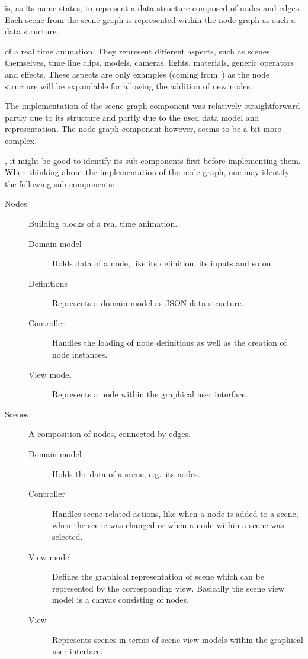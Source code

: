 \documentclass[%
    a4paper,    %
    justified,  %
    nobib,      %
    openany     %
]{tufte-book}
\begin{document}
 is, as its name states, to
represent a data structure composed of nodes and edges. Each scene from the
scene graph is represented within the node graph as such a data structure.

 of a real time animation. They
represent different aspects, such as scenes themselves, time line clips, models,
cameras, lights, materials, generic operators and effects. These aspects are
only examples (coming from~) as
the node structure will be expandable for allowing the addition of new nodes.

The implementation of the scene graph component was relatively straightforward
partly due to its structure and partly due to the used data model and
representation. The node graph component however, seems to be a bit more complex.

, it might be
good to identify its sub components first before implementing them. When
thinking about the implementation of the node graph, one may identify the
following sub components:

\begin{description}
\item[Nodes] Building blocks of a real time animation.
  \begin{description}
    \item[Domain model] Holds data of a node, like its definition, its inputs
                        and so on.
    \item[Definitions]  Represents a domain model as JSON data structure.
    \item[Controller]   Handles the loading of node definitions as well as the
                        creation of node instances.
    \item[View model]   Represents a node within the graphical user interface.
  \end{description}
\end{description}

\begin{description}
\item[Scenes] A composition of nodes, connected by edges.
  \begin{description}
    \item[Domain model] Holds the data of a scene, e.g.\ its nodes.
    \item[Controller]   Handles scene related actions, like when a node is added
                        to a scene, when the scene was changed or when a node
                        within a scene was selected.
    \item[View model]   Defines the graphical representation of scene which can
                        be represented by the corresponding view. Basically the
                        scene view model is a canvas consisting of nodes.
    \item[View]         Represents scenes in terms of scene view models within the
                        graphical user interface.
  \end{description}
\end{description}
\end{document}
